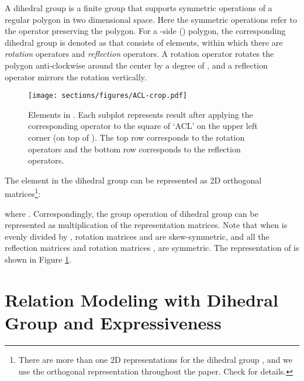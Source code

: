 \documentclass[11pt,a4paper]{article}
\begin{document}
A dihedral group is a finite group that supports symmetric operations of a regular polygon in two dimensional space. Here the symmetric operations refer to the operator preserving the polygon. For a -side () polygon, the corresponding dihedral group is denoted as  that consists of  elements, within which there are  \emph{rotation} operators and  \emph{reflection} operators. A rotation operator  rotates the polygon anti-clockwise around the center by a degree of , and a reflection operator  mirrors the rotation  vertically.

\begin{figure}[ht]
\begin{centering}
\texttt{[image: sections/figures/ACL-crop.pdf]}
\par\end{centering}
\caption{Elements in . Each subplot represents result after applying the corresponding operator to the square of `ACL' on the upper left corner (on top of ). The top row corresponds to the rotation operators and the bottom row corresponds to the reflection operators.} \label{figure: dihedral}
\end{figure}

The element in the dihedral group  can be represented as 2D orthogonal matrices\footnote{There are more than one 2D representations for the dihedral group , and we use the orthogonal representation throughout the paper. Check \citealt{group_rep} for details.}:

where . Correspondingly, the group operation of dihedral group can be represented as multiplication of the representation matrices. Note that when  is evenly divided by , rotation matrices  and  are skew-symmetric, and all the reflection matrices  and rotation matrices ,  are symmetric. The representation of  is shown in Figure \ref{figure: dihedral}. 

 \section{Relation Modeling with Dihedral Group and Expressiveness}\label{sec: dihedral}
\end{document}
